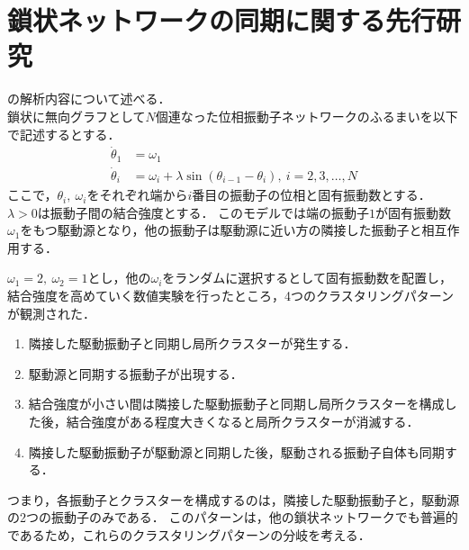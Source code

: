 \documentclass[../main]{subfiles}
\begin{document}
\chapter{鎖状ネットワークの同期に関する先行研究}
\label{chap:appendix}
\cite{XiaHuang:130506}の解析内容について述べる．\\
鎖状に無向グラフとして$N$個連なった位相振動子ネットワークのふるまいを以下で記述するとする．
\begin{align*}
    \dot{\theta}_1&=\omega_1\\
    \dot{\theta}_i&=\omega_i+\lambda\sin(\theta_{i-1}-\theta_i),\ i=2,3,\ldots,N
\end{align*}
ここで，$\theta_i,\ \omega_i$をそれぞれ端から$i$番目の振動子の位相と固有振動数とする．$\lambda>0$は振動子間の結合強度とする．
このモデルでは端の振動子$1$が固有振動数$\omega_1$をもつ駆動源となり，他の振動子は駆動源に近い方の隣接した振動子と相互作用する．

$\omega_1=2,\ \omega_2=1$とし，他の$\omega_i$をランダムに選択するとして固有振動数を配置し，結合強度を高めていく数値実験を行ったところ，4つのクラスタリングパターンが観測された．
\renewcommand{\labelenumi}{Case  \theenumi}
\begin{enumerate}
    \item \label{enu:case1} 隣接した駆動振動子と同期し局所クラスターが発生する．
    \item \label{enu:case2} 駆動源と同期する振動子が出現する．
    \item \label{enu:case3} 結合強度が小さい間は隣接した駆動振動子と同期し局所クラスターを構成した後，結合強度がある程度大きくなると局所クラスターが消滅する．
    \item \label{enu:case4} 隣接した駆動振動子が駆動源と同期した後，駆動される振動子自体も同期する．
\end{enumerate}
つまり，各振動子とクラスターを構成するのは，隣接した駆動振動子と，駆動源の2つの振動子のみである．
このパターンは，他の鎖状ネットワークでも普遍的であるため，これらのクラスタリングパターンの分岐を考える．
\end{document}
